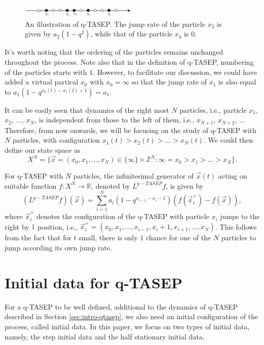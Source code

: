 \begin{figure}
	\centering
	\includegraphics[width=0.5\textwidth]{q-TASEP}
	\caption[An illustration of q-TASEP]
	{An illustration of q-TASEP. The jump rate of the particle $x_2$ is given by $a_2(1-q^2)$, while that of the particle $x_4$ is $0$.}
	\label{fig:q-TASEP}
\end{figure}

It's worth noting that the ordering of the particles remains unchanged throughout the process. Note also that in the definition of q-TASEP, numbering of the particles starts with $1$. However, to facilitate our discussion, we could have added a virtual partical $x_0$ with $x_0 = \infty$ so that the jump rate of $x_1$ is also equal to $a_1 (1-q^{x_0(t) - x_1(t) + 1}) = a_1$. 

It can be easily seen that dynamics of the right most $N$ particles, i.e., particle $x_1$, $x_2$, $\dots$, $x_N$, is independent from those to the left of them, i.e., $x_{N+1}$, $x_{N+2}$, $\dots$ Therefore, from now onwards, we will be focusing on the study of q-TASEP with $N$ particles, with configuration $x_1(t) > x_2(t) > \dots > x_N(t)$. We could then define our state space as $$X^N = \{\vec{x}=(x_0,x_1,\dots, x_N) \in \{\infty \} \times \mathbb{Z}^N : \infty = x_0 > x_1 > \dots > x_N \}.$$

For q-TASEP with $N$ particles, the infinitesimal generator of $\vec{x}(t)$ acting on suitable function $f: X^N \rightarrow \mathbb{R}$, denoted by $L^{q-TASEP} f$, is given by $$(L^{q-TASEP} f) (\vec{x}) = \sum_{i=1}^{N} a_i (1-q^{x_{i-1} - x_i - 1}) (f(\vec{x}_i^{+}) - f(\vec{x})),$$ where $\vec{x}_i^{+}$ denotes the configuration of the q-TASEP with particle $x_i$ jumps to the right by $1$ position, i.e., $\vec{x}_i^+ = (x_0, x_1, \dots, x_{i-1}, x_i+1, x_{i+1}, \dots, x_N)$. This follows from the fact that for $t$ small, there is only $1$ chance for one of the $N$ particles to jump according its own jump rate.

\section{Initial data for q-TASEP}
For a q-TASEP to be well defined, additional to the dynamics of q-TASEP described in Section \ref{sec:intro-qtasep}, we also need an initial configuration of the process, called initial data. In this paper, we focus on two types of initial data, namely, the step initial data and the half stationary initial data. 

